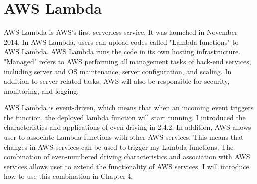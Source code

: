 \section{AWS Lambda}
AWS Lambda is AWS's first serverless service,
It was launched in November 2014. In AWS Lambda, users can upload codes called "Lambda functions" to AWS Lambda. AWS Lambda runs the code in its own hosting infrastructure. "Managed" refers to AWS performing all management tasks of back-end services, including server and OS maintenance, server configuration, and scaling. In addition to server-related tasks, AWS will also be responsible for security, monitoring, and logging.
\par
AWS Lambda is event-driven, which means that when an incoming event triggers the function, the deployed lambda function will start running. I introduced the characteristics and applications of even driving in 2.4.2. In addition, AWS allows user to associate Lambda functions with other AWS services. This means that changes in AWS services can be used to trigger my Lambda functions. The combination of even-numbered driving characteristics and association with AWS services allows user to extend the functionality of AWS services. I will introduce how to use this combination in Chapter 4.

